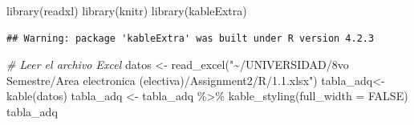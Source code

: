 \documentclass[
]{article}
\newenvironment{Shaded}{\begin{snugshade}}{\end{snugshade}}
\newcommand{\AttributeTok}[1]{\textcolor[rgb]{0.77,0.63,0.00}{#1}}
\newcommand{\CommentTok}[1]{\textcolor[rgb]{0.56,0.35,0.01}{\textit{#1}}}
\newcommand{\ConstantTok}[1]{\textcolor[rgb]{0.00,0.00,0.00}{#1}}
\newcommand{\FunctionTok}[1]{\textcolor[rgb]{0.00,0.00,0.00}{#1}}
\newcommand{\NormalTok}[1]{#1}
\newcommand{\OtherTok}[1]{\textcolor[rgb]{0.56,0.35,0.01}{#1}}
\newcommand{\SpecialCharTok}[1]{\textcolor[rgb]{0.00,0.00,0.00}{#1}}
\newcommand{\StringTok}[1]{\textcolor[rgb]{0.31,0.60,0.02}{#1}}
\begin{document}
\begin{Shaded}
\begin{Highlighting}[]
\FunctionTok{library}\NormalTok{(readxl)}
\FunctionTok{library}\NormalTok{(knitr) }
\FunctionTok{library}\NormalTok{(kableExtra)}
\end{Highlighting}
\end{Shaded}

\begin{verbatim}
## Warning: package 'kableExtra' was built under R version 4.2.3
\end{verbatim}

\begin{Shaded}
\begin{Highlighting}[]
\CommentTok{\# Leer el archivo Excel}
\NormalTok{datos }\OtherTok{\textless{}{-}} \FunctionTok{read\_excel}\NormalTok{(}\StringTok{"\textasciitilde{}/UNIVERSIDAD/8vo Semestre/Area electronica (electiva)/Assignment2/R/1.1.xlsx"}\NormalTok{)}
\NormalTok{tabla\_adq}\OtherTok{\textless{}{-}}\FunctionTok{kable}\NormalTok{(datos)}
\NormalTok{tabla\_adq }\OtherTok{\textless{}{-}}\NormalTok{ tabla\_adq }\SpecialCharTok{\%\textgreater{}\%}
  \FunctionTok{kable\_styling}\NormalTok{(}\AttributeTok{full\_width =} \ConstantTok{FALSE}\NormalTok{)}
\NormalTok{tabla\_adq}
\end{Highlighting}
\end{Shaded}
\end{document}
